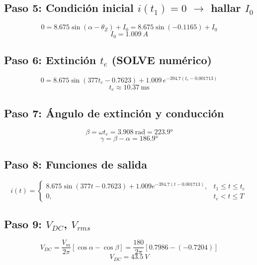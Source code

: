\documentclass[12pt]{article}
\begin{document}
\subsection*{Paso 5: Condición inicial $i(t_1)=0$ $\rightarrow$ hallar $I_0$}
\begin{equation}
0=8.675\sin(\alpha-\theta_Z)+I_0=8.675\sin(-0.1165)+I_0
\end{equation}
\begin{equation}
\boxed{I_0=1.009\ A}
\end{equation}

\subsection*{Paso 6: Extinción $t_e$ (SOLVE numérico)}
\begin{equation}
0=8.675\sin(377t_e-0.7623)+1.009\,e^{-394.7(t_e-0.001713)}
\end{equation}
\begin{equation}
\boxed{t_e\approx10.37\ \text{ms}}
\end{equation}

\subsection*{Paso 7: Ángulo de extinción y conducción}
\begin{equation}
\beta=\omega t_e=3.908\ \text{rad}=223.9°
\end{equation}
\begin{equation}
\gamma=\beta-\alpha=186.9°
\end{equation}

\subsection*{Paso 8: Funciones de salida}
\begin{equation}
i(t)=
\begin{cases}
8.675\sin(377t-0.7623)+1.009e^{-394.7(t-0.001713)}, & t_1\leq t\leq t_e\\
0, & t_e<t\leq T
\end{cases}
\end{equation}

\subsection*{Paso 9: $V_{DC}$, $V_{rms}$}
\begin{equation}
V_{DC}=\frac{V_m}{2\pi}[\cos\alpha-\cos\beta]=\frac{180}{2\pi}[0.7986-(-0.7204)]
\end{equation}
\begin{equation}
\boxed{V_{DC}=43.5\ V}
\end{equation}
\end{document}
